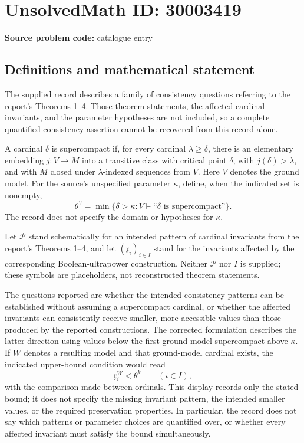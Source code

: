 \documentclass[11pt]{article}
\begin{document}
\section*{UnsolvedMath ID: 30003419}
\textbf{Source problem code:} catalogue entry
\subsection{Definitions and mathematical statement}
The supplied record describes a family of consistency questions referring to the report's Theorems 1--4. Those theorem statements, the affected cardinal invariants, and the parameter hypotheses are not included, so a complete quantified consistency assertion cannot be recovered from this record alone.

A cardinal \(\delta\) is supercompact if, for every cardinal \(\lambda\geq\delta\), there is an elementary embedding \(j:V\to M\) into a transitive class with critical point \(\delta\), with \(j(\delta)>\lambda\), and with \(M\) closed under \(\lambda\)-indexed sequences from \(V\). Here \(V\) denotes the ground model. For the source's unspecified parameter \(\kappa\), define, when the indicated set is nonempty,
\[
\theta^V=\min\{\delta>\kappa:V\models\text{``}\delta\text{ is supercompact''}\}.
\]
The record does not specify the domain or hypotheses for \(\kappa\).

Let \(\mathcal P\) stand schematically for an intended pattern of cardinal invariants from the report's Theorems 1--4, and let \((\mathfrak x_i)_{i\in I}\) stand for the invariants affected by the corresponding Boolean-ultrapower construction. Neither \(\mathcal P\) nor \(I\) is supplied; these symbols are placeholders, not reconstructed theorem statements.

The questions reported are whether the intended consistency patterns can be established without assuming a supercompact cardinal, or whether the affected invariants can consistently receive smaller, more accessible values than those produced by the reported constructions. The corrected formulation describes the latter direction using values below the first ground-model supercompact above \(\kappa\). If \(W\) denotes a resulting model and that ground-model cardinal exists, the indicated upper-bound condition would read
\[
\mathfrak x_i^W<\theta^V\qquad(i\in I),
\]
with the comparison made between ordinals. This display records only the stated bound; it does not specify the missing invariant pattern, the intended smaller values, or the required preservation properties. In particular, the record does not say which patterns or parameter choices are quantified over, or whether every affected invariant must satisfy the bound simultaneously.
\end{document}
